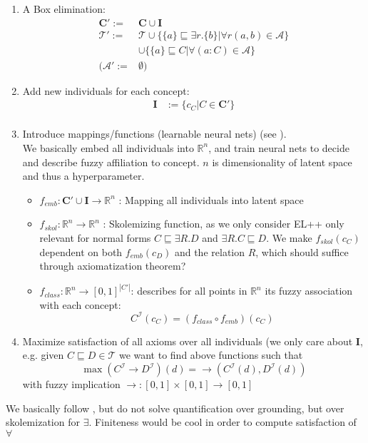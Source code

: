 \documentclass[]{article}
\begin{document}
\begin{enumerate}
	\item A Box elimination:
	\begin{align*}
		\mathbf{C'}:=& \mathbf{C} \cup \mathbf{I}\\
		\mathcal{T}':=& \mathcal{T} \cup\{\{a\}\sqsubseteq\exists r.\{b\}|\forall r(a,b)\in \mathcal{A}\}\\
		&\cup \{\{a\}\sqsubseteq C| \forall (a:C)\in\mathcal{A}\}\\
		(\mathcal{A}':=&\emptyset)
	\end{align*}
	\item Add new individuals for each concept:
	\begin{align*}
		\mathbf{I}&:=\{c_C | C\in\mathbf{C'}\}\\
	\end{align*}
	\item Introduce mappings/functions (learnable neural nets) (see \cite{LTN}).\\
	We basically embed all individuals into $\mathbb{R}^n$, and train neural nets to decide and describe fuzzy affiliation to concept. $n$ is dimensionality of latent space and thus a hyperparameter.
	\begin{itemize}
		\item $f_{emb}:\mathbf{C}'\cup \mathbf{I}\rightarrow\mathbb{R}^n$ : Mapping all individuals into latent space
		\item $f_{skol}:\mathbb{R}^n\rightarrow\mathbb{R}^n$ : Skolemizing function, as we only consider EL++ only relevant for normal forms $C\sqsubseteq\exists R.D$ and $\exists R.C\sqsubseteq D$. We make $f_{skol}(c_C)$ dependent on both $f_{emb}(c_D)$ and the relation $R$, which should suffice through axiomatization theorem?
		\item $f_{class}:\mathbb{R}^n\rightarrow [0,1]^{|C'|}$: describes for all points in $\mathbb{R}^n$ its fuzzy association with each concept:
		\begin{equation*}
			C^\mathcal{I}(c_C)=(f_{class} \circ f_{emb})(c_C)
		\end{equation*}
	\end{itemize}
	\item Maximize satisfaction of all axioms over all individuals (we only care about $\mathbf{I}$, e.g. given $C\sqsubseteq D\in \mathcal{T}$ we want to find above functions such that
	\begin{equation}
		\max (C^\mathcal{I} \rightarrow D^\mathcal{I})(d) = \rightarrow (C^\mathcal{I}(d), D^\mathcal{I}(d))
	\end{equation}
	with fuzzy implication $\rightarrow:[0,1] \times [0,1]\rightarrow [0,1]$
	
\end{enumerate}
We basically follow \cite{LTN}, but do not solve quantification over grounding, but over skolemization for $\exists$. Finiteness would be cool in order to compute satisfaction of $\forall$ 
\end{document}
